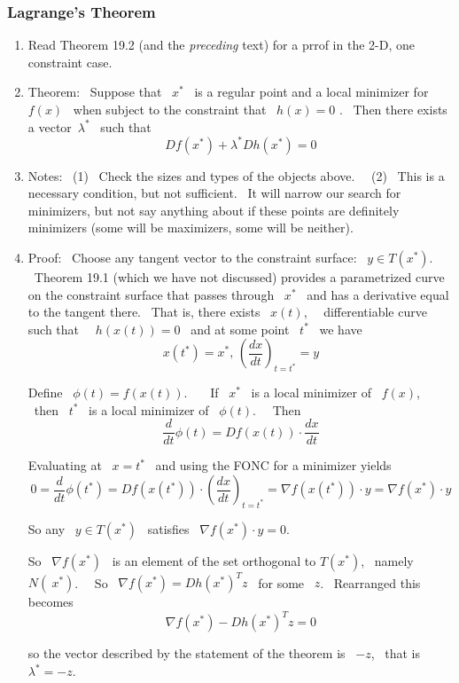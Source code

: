 \documentclass[12pt,thmsa]{article}
\begin{document}
\vspace{1pt}

\subsubsection{Lagrange's Theorem}

\vspace{1pt}

\begin{enumerate}
\item  Read Theorem 19.2 (and the \emph{preceding} text) for a prrof in the
2-D, one constraint case.\bigskip

\item  Theorem: \ Suppose that \ $x^{\ast }$ \ is a regular point and a
local minimizer for \ $f(x)$ \ when subject to the constraint that \ $h(x)=0$%
. \ Then there exists a vector\ $\lambda ^{\ast }$ \ such that
\[
Df(x^{\ast })+\lambda ^{\ast }Dh(x^{\ast })=0
\]

\item  Notes: \ (1) \ Check the sizes and types of the objects above. \ \
(2) \ This is a necessary condition, but not sufficient. \ It will narrow
our search for minimizers, but not say anything about if these points are
definitely minimizers (some will be maximizers, some will be neither).

\item  Proof: \ Choose any tangent vector to the constraint surface: \ $y\in
T(x^{\ast })$. \ Theorem 19.1 (which we have not discussed) provides a
parametrized curve on the constraint surface that passes through \ $x^{\ast }
$ \ and has a derivative equal to the tangent there. \ That is, there exists
\ $x(t)$, \ \ differentiable curve such that \ \ $h(x(t))=0$ \ and at some
point \ $t^{\ast }$ \ we have \
\[
x(t^{\ast })=x^{\ast }\text{, \ \ \ \ }\left( \frac{dx}{dt}\right)
_{t=t^{\ast }}=y
\]

Define \ $\phi (t)=f(x(t))$. \ \ \ If \ $x^{\ast }$ \ is a local minimizer
of \ $f(x)$, \ then \ $t^{\ast }$ \ is a local minimizer of \ $\phi (t)$. \
\ Then
\[
\frac{d}{dt}\phi (t)=Df(x(t))\cdot \frac{dx}{dt}
\]

Evaluating at \ $x=t^{\ast }$ \ and using the FONC for a minimizer yields
\[
0=\frac{d}{dt}\phi (t^{\ast })=Df(x(t^{\ast }))\cdot \left( \frac{dx}{dt}%
\right) _{t=t^{\ast }}=\nabla f(x(t^{\ast }))\cdot y=\nabla f(x^{\ast
})\cdot y
\]

So any \ $y\in T(x^{\ast })$ \ satisfies \ $\nabla f(x^{\ast })\cdot y=0$.

So \ $\nabla f(x^{\ast })$ \ is an element of the set orthogonal to $%
T(x^{\ast })$, \ namely $N(\ x^{\ast })$. \ \ So \ $\nabla f(x^{\ast
})=Dh(x^{\ast })^{T}z$ \ for some \ $z$. \ Rearranged this becomes
\[
\nabla f(x^{\ast })-Dh(x^{\ast })^{T}z=0
\]

so the vector described by the statement of the theorem is \ $-z$, \ that is
\ $\lambda ^{\ast }=-z$.
\end{enumerate}
\end{document}
